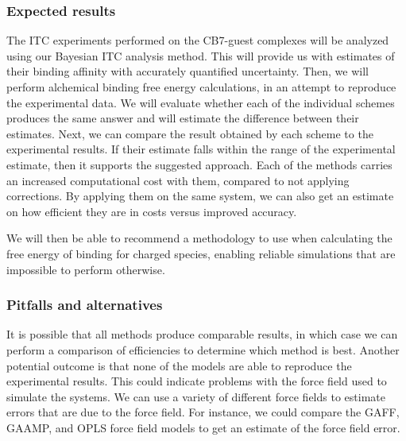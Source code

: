 \documentclass[10pt,final]{article}
\begin{document}
\subsubsection*{Expected results}
The ITC experiments performed on the CB7-guest complexes will be analyzed using our Bayesian ITC analysis method.
%
This will provide us with estimates of their binding affinity with accurately quantified uncertainty. 
%
Then, we will perform alchemical binding free energy calculations, in an attempt to reproduce the experimental data.
%
We will evaluate whether each of the individual schemes produces the same answer and will estimate the difference between their estimates. 
%
Next, we can compare the result obtained by each scheme to the experimental results. If their estimate falls within the range of the experimental estimate, then it supports the suggested approach.
%
Each of the methods carries an increased computational cost with them, compared to not applying corrections.
%
By applying them on the same system, we can also get an estimate on how efficient they are in costs versus improved accuracy.

We will then be able to recommend a methodology to use when calculating the free energy of binding for charged species, enabling reliable simulations that are impossible to perform otherwise.

\subsubsection*{Pitfalls and alternatives}

It is possible that all methods produce comparable results, in which case we can perform a comparison of efficiencies to determine which method is best.
%
Another potential outcome is that none of the models are able to reproduce the experimental results.
%
This could indicate problems with the force field used to simulate the systems.
%
We can use a variety of different force fields to estimate errors that are due to the force field.
%
For instance, we could compare the GAFF\autocite{Wang2004a}, GAAMP\autocite{Huang2013a}, and OPLS\autocite{Schroedinger2014b} force field models to get an estimate of the force field error. 
\end{document}

